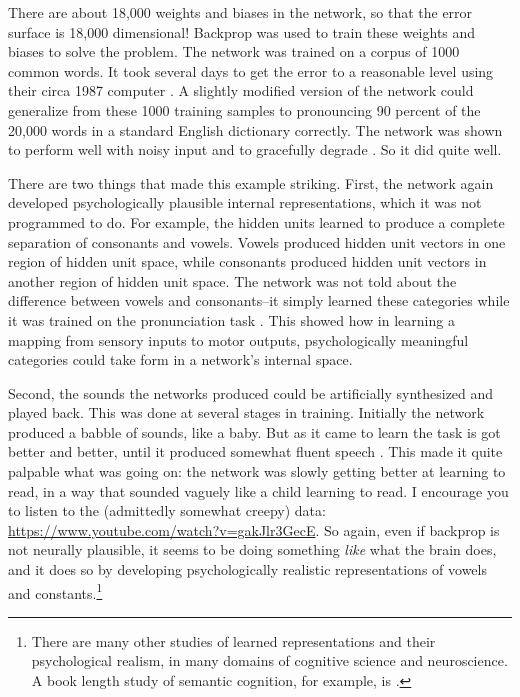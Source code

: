 There are about 18,000 weights and biases in the network, so that the error surface is 18,000 dimensional! Backprop was used to train these weights and biases to solve the problem. The network was trained on a corpus of 1000 common words. It took several days to get the error to a reasonable level using their circa 1987 computer \cite{sejnowski1987parallel}. A slightly modified version of the network could generalize from these 1000 training samples to pronouncing 90 percent of the 20,000 words in a standard English dictionary correctly. The network was shown to perform well with noisy input and to gracefully degrade \cite{sejnowski1987parallel}. So it did quite well.

There are two things that made this example striking. First, the network again developed psychologically plausible internal representations, which it was not programmed to do. For example, the hidden units learned to produce a complete separation of consonants and vowels. Vowels produced hidden unit vectors in one region of hidden unit space, while consonants produced hidden unit vectors in another region of hidden unit space. The network was not told about the difference between vowels and consonants--it simply learned these categories while it was trained on the pronunciation task \cite{sejnowski1987parallel}. This showed  how in learning a mapping from sensory inputs to motor outputs, psychologically meaningful categories could take form in a network's internal space.

Second, the sounds the networks produced could be artificially synthesized and played back. This was done at several stages in training. Initially the network produced a babble of sounds, like a baby. But as it came to learn the task is got better and better, until it produced somewhat fluent speech \cite{sejnowski1987parallel}. This made it quite palpable what was going on: the network was slowly getting better at learning to read, in a way that sounded vaguely like a child learning to read. I encourage you to listen to the (admittedly somewhat creepy) data: \url{https://www.youtube.com/watch?v=gakJlr3GecE}. So again, even if backprop is not neurally plausible, it seems to be doing something \emph{like} what the brain does, and it does so by developing psychologically realistic representations of vowels and constants.\footnote{There are many other studies of learned representations and their psychological realism, in many  domains of cognitive science and neuroscience. A book length  study of semantic cognition, for example, is \cite{rogers2004semantic}.}

